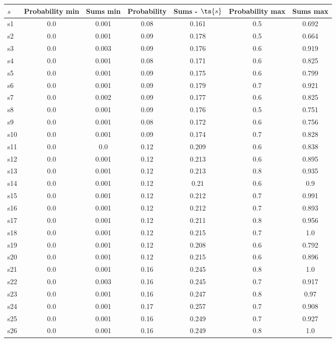 \documentclass{article}
\begin{document}
\noindent\begin{tabular}{|l|c|c|c|c|c|c|}
\hline
$s$& Probability min & Sums min & Probability & Sums - $\ts{s}$ & Probability max & Sums max\\
\hline
s1 &0.0 & 0.001 & 0.08 & 0.161 & 0.5 & 0.692\\
\hline
s2 &0.0 & 0.001 & 0.09 & 0.178 & 0.5 & 0.664\\
\hline
s3 &0.0 & 0.003 & 0.09 & 0.176 & 0.6 & 0.919\\
\hline
s4 &0.0 & 0.001 & 0.08 & 0.171 & 0.6 & 0.825\\
\hline
s5 &0.0 & 0.001 & 0.09 & 0.175 & 0.6 & 0.799\\
\hline
s6 &0.0 & 0.001 & 0.09 & 0.179 & 0.7 & 0.921\\
\hline
s7 &0.0 & 0.002 & 0.09 & 0.177 & 0.6 & 0.825\\
\hline
s8 &0.0 & 0.001 & 0.09 & 0.176 & 0.5 & 0.751\\
\hline
s9 &0.0 & 0.001 & 0.08 & 0.172 & 0.6 & 0.756\\
\hline
s10 &0.0 & 0.001 & 0.09 & 0.174 & 0.7 & 0.828\\
\hline
s11 &0.0 & 0.0 & 0.12 & 0.209 & 0.6 & 0.838\\
\hline
s12 &0.0 & 0.001 & 0.12 & 0.213 & 0.6 & 0.895\\
\hline
s13 &0.0 & 0.001 & 0.12 & 0.213 & 0.8 & 0.935\\
\hline
s14 &0.0 & 0.001 & 0.12 & 0.21 & 0.6 & 0.9\\
\hline
s15 &0.0 & 0.001 & 0.12 & 0.212 & 0.7 & 0.991\\
\hline
s16 &0.0 & 0.001 & 0.12 & 0.212 & 0.7 & 0.893\\
\hline
s17 &0.0 & 0.001 & 0.12 & 0.211 & 0.8 & 0.956\\
\hline
s18 &0.0 & 0.001 & 0.12 & 0.215 & 0.7 & 1.0\\
\hline
s19 &0.0 & 0.001 & 0.12 & 0.208 & 0.6 & 0.792\\
\hline
s20 &0.0 & 0.001 & 0.12 & 0.215 & 0.6 & 0.896\\
\hline
s21 &0.0 & 0.001 & 0.16 & 0.245 & 0.8 & 1.0\\
\hline
s22 &0.0 & 0.003 & 0.16 & 0.245 & 0.7 & 0.917\\
\hline
s23 &0.0 & 0.001 & 0.16 & 0.247 & 0.8 & 0.97\\
\hline
s24 &0.0 & 0.001 & 0.17 & 0.257 & 0.7 & 0.908\\
\hline
s25 &0.0 & 0.001 & 0.16 & 0.249 & 0.7 & 0.927\\
\hline
s26 &0.0 & 0.001 & 0.16 & 0.249 & 0.8 & 1.0\\

\end{tabular}
\end{document}
